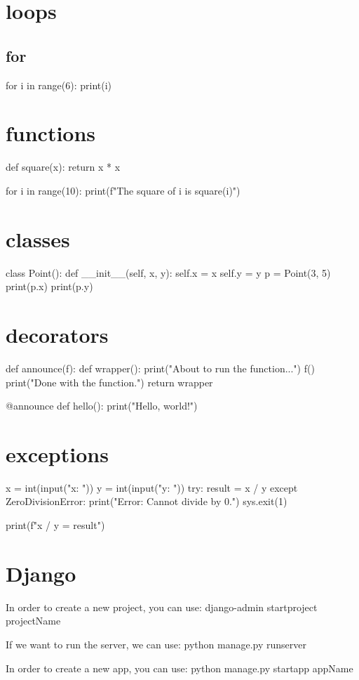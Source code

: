 \documentclass[12pt]{article}
\begin{document}
\section{loops}
\subsection{for}
for i in range(6):
    print(i)

\section{functions}
def square(x):
    return x * x

for i in range(10):
    print(f"The square of {i} is {square(i)}")

\section{classes}
class Point():
    def __init__(self, x, y):
        self.x = x
        self.y = y
p = Point(3, 5)
print(p.x)
print(p.y)

\section{decorators}
def announce(f):
    def wrapper():
        print("About to run the function...")
        f()
        print("Done with the function.")
    return wrapper

@announce
def hello():
    print("Hello, world!")

\section{exceptions}
x = int(input("x: "))
y = int(input("y: "))
try:
    result = x / y
except ZeroDivisionError:
    print("Error: Cannot divide by 0.")
    sys.exit(1)

print(f"{x} / {y} = {result}")


\section{Django}
In order to create a new project, you can use:
django-admin startproject projectName

If we want to run the server, we can use:
python manage.py runserver

In order to create a new app, you can use:
python manage.py startapp appName
\end{document}
